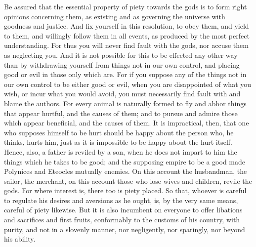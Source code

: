 Be assured that the essential property of piety towards the gods
is to form right opinions concerning them, as existing and as governing
the universe with goodness and justice. And fix yourself in this resolution,
to obey them, and yield to them, and willingly follow them in all
events, as produced by the most perfect understanding. For thus you
will never find fault with the gods, nor accuse them as neglecting
you. And it is not possible for this to be effected any other way
than by withdrawing yourself from things not in our own control, and
placing good or evil in those only which are. For if you suppose any
of the things not in our own control to be either good or evil, when
you are disappointed of what you wish, or incur what you would avoid,
you must necessarily find fault with and blame the authors. For every
animal is naturally formed to fly and abhor things that appear hurtful,
and the causes of them; and to pursue and admire those which appear
beneficial, and the causes of them. It is impractical, then, that
one who supposes himself to be hurt should be happy about the person
who, he thinks, hurts him, just as it is impossible to be happy about
the hurt itself. Hence, also, a father is reviled by a son, when he
does not impart to him the things which he takes to be good; and the
supposing empire to be a good made Polynices and Eteocles mutually
enemies. On this account the husbandman, the sailor, the merchant,
on this account those who lose wives and children, revile the gods.
For where interest is, there too is piety placed. So that, whoever
is careful to regulate his desires and aversions as he ought, is,
by the very same means, careful of piety likewise. But it is also
incumbent on everyone to offer libations and sacrifices and first
fruits, conformably to the customs of his country, with purity, and
not in a slovenly manner, nor negligently, nor sparingly, nor beyond
his ability. 
